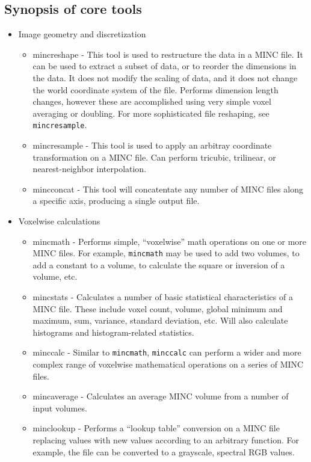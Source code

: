 \documentclass{article}
\begin{document}
\subsection{Synopsis of core tools}
\begin{itemize}
\item Image geometry and discretization
\begin{itemize}
\item mincreshape - This tool is used to restructure the data in a MINC
file.  It can be used to extract a subset of data, or to reorder the 
dimensions in the data.  It does not modify the scaling of data, and it
does not change the world coordinate system of the file.  Performs dimension
length changes, however these are accomplished using very simple voxel
averaging or doubling.  For more sophisticated file reshaping, see
{\tt mincresample}.
\item mincresample - This tool is used to apply an arbitray coordinate
transformation on a MINC file.  Can perform tricubic, trilinear, or
nearest-neighbor interpolation.
\item mincconcat - This tool will concatentate any number of MINC
files along a specific axis, producing a single output file.
\end{itemize}
\item Voxelwise calculations
\begin{itemize}
\item mincmath - Performs simple, ``voxelwise'' math operations
on one or more MINC files.  For example, {\tt mincmath} may be used
to add two volumes, to add a constant to a volume, to calculate the
square or inversion of a volume, etc.
\item mincstats - Calculates a number of basic statistical
characteristics of a MINC file.  These include voxel count, volume,
global minimum and maximum, sum, variance, standard deviation, etc.
Will also calculate histograms and histogram-related statistics.
\item minccalc - Similar to {\tt mincmath}, {\tt minccalc} can perform
a wider and more complex range of voxelwise mathematical operations
on a series of MINC files.
\item mincaverage - Calculates an average MINC volume from a number of
input volumes.
\item minclookup - Performs a ``lookup table'' conversion on a MINC file
replacing values with new values according to an arbitrary function.
For example, the file can be converted to a grayscale, spectral RGB values.

\end{itemize}
\end{itemize}
\end{document}
